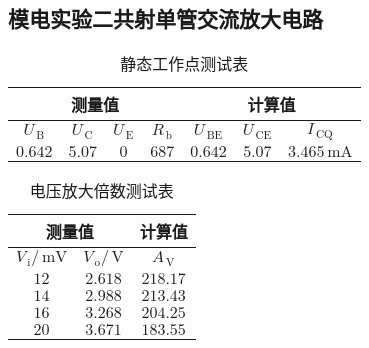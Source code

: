 \documentclass{ctexart}
\renewcommand{\rm}{\,\mathrm}
\begin{document}
    \subsection{模电实验二\quad 共射单管交流放大电路}
    \begin{table}[h]
    	\centering
    	\caption{静态工作点测试表}
    	\begin{tabular}{|c|c|c|c|c|c|c|}
    		\hline
    		\multicolumn{4}{|c|}{测量值} & \multicolumn{3}{|c|}{计算值}\\
    		\hline
    		$U_{\rm{B}}$ & $U_{\rm{C}}$ & $U_{\rm{E}}$ & $R_{\rm{b}}$ & $U_{\rm{BE}}$ & $U_{\rm{CE}}$ & $I_{\rm{CQ}}$\\
    		\hline
    		$0.642$ & $5.07$ & $0$ & $687$ & $0.642$ & $5.07$ & $3.465\rm{mA}$\\
    		 \hline
    	\end{tabular}
    \end{table}
    \begin{table}[h]
    	\centering
    	\caption{电压放大倍数测试表}
    	\begin{tabular}{|c|c|c|}
    		\hline
    		\multicolumn{2}{|c|}{测量值} & 计算值\\
    		\hline
    		$V_{\rm{i}}/\rm{mV}$ & $V_{\rm{o}}/\rm{V}$ & $A_{\rm{V}}$\\
    		\hline
    		$12$ & $2.618$ & $218.17$ \\
    		\hline
    		$14$ & $2.988$ & $213.43$ \\
    		\hline
    		$16$ & $3.268$ & $204.25$ \\
    		\hline
    		$20$ & $3.671$ & $183.55$ \\
    		\hline
    	\end{tabular}
    \end{table}
\end{document}
